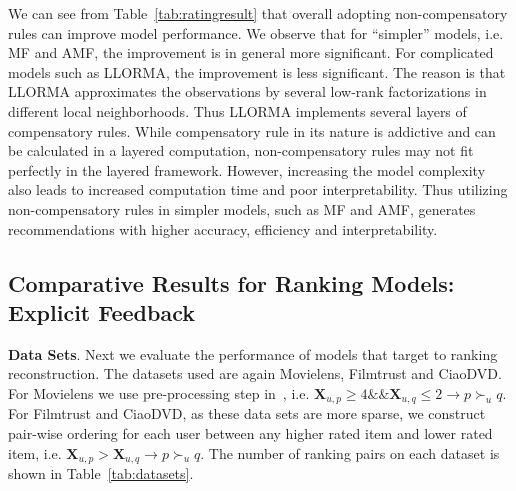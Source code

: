 \documentclass[letterpaper]{article} %
\newcommand{\Rating}{\mathbf{X}}
\begin{document}
We can see from Table~\ref{tab:ratingresult} that overall adopting non-compensatory rules can improve model performance. We observe that for ``simpler'' models, i.e. MF and AMF,  the improvement is in general more significant. For complicated models such as LLORMA, the improvement is less significant. The reason is that LLORMA approximates the observations by several low-rank factorizations in different local neighborhoods.  Thus LLORMA implements several layers of compensatory rules. While compensatory rule in its nature is addictive and can be calculated in a layered computation, non-compensatory rules may not fit perfectly in the layered framework. However, increasing the model complexity also leads to increased computation time and poor interpretability. Thus utilizing non-compensatory rules in simpler models, such as MF and AMF, generates recommendations with higher accuracy, efficiency and interpretability. 


\subsection{Comparative Results for Ranking Models: Explicit Feedback}

\textbf{Data Sets}. Next we evaluate the performance of models that target to ranking reconstruction. The datasets used are again Movielens, Filmtrust and CiaoDVD. For Movielens we use pre-processing step in~\cite{Hu2017Decoupled}, i.e.  $\Rating_{u,p}\geq 4 \&\& \Rating_{u,q}\leq 2 \rightarrow p\succ_u q$. For Filmtrust and CiaoDVD, as these data sets are more sparse, we construct pair-wise ordering for each user between any higher rated item and lower rated item, i.e. $\Rating_{u,p}>\Rating_{u,q}\rightarrow p\succ_u q$. The number of ranking pairs on each dataset is shown in Table~\ref{tab:datasets}.
\end{document}
